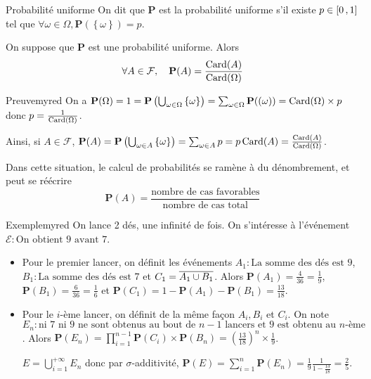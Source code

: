     \begin{defi}{Probabilité uniforme}{}
        On dit que $\mathbf{P}$ est la probabilité uniforme s’il existe $p \in \left[ 0 \, , 1 \right]$ tel que $\forall \omega \in \Omega, \mathbf{P}(\left\{\omega\right\}) = p$.
    \end{defi}

    \begin{theo}{}{}
        On suppose que $\mathbf{P}$ est une probabilité uniforme. Alors
        \[ \forall A \in \mathcal{F}, \quad \mathbf{P}(A) = \frac{\operatorname{Card}(A)}{\operatorname{Card}(\Omega)} \]   
    \end{theo}

    \begin{demo}{Preuve}{myred}
        On a $\mathbf{P}(\Omega) = 1 = \mathbf{P}\left(\bigcup_{\omega \in \Omega} \left\{\omega\right\}\right) = \sum_{\omega \in \Omega} \mathbf{P}(\left(\omega\right)) = \operatorname{Card}(\Omega) \times p$ donc $p = \frac{1}{\operatorname{Card}(\Omega)}$.

        Ainsi, si $A \in \mathcal{F}$, $\mathbf{P}(A) = \mathbf{P}\left(\bigcup_{\omega \in A} \left\{\omega\right\}\right) = \sum_{\omega \in A} p = p \operatorname{Card}(A) = \frac{\operatorname{Card}(A)}{\operatorname{Card}(\Omega)}$.
    \end{demo}

    Dans cette situation, le calcul de probabilités se ramène à du dénombrement, et peut se réécrire 
    \[ \mathbf{P}(A) = \frac{\text{nombre de cas favorables}}{\text{nombre de cas total}} \]   

    \begin{omed}{Exemple}{myred}
        On lance 2 dés, une infinité de fois. On s’intéresse à l’événement $\mathcal{E} : \text{On obtient 9 avant 7}$.
        \begin{itemize}
            \item Pour le premier lancer, on définit les événements $A_1 : \text{La somme des dés est 9}$, $B_1 : \text{La somme des dés est 7}$ et $C_1 = \overline{A_1 \cup B_1}$. Alors $\mathbf{P}(A_1) = \frac{4}{36} = \frac{1}{9}$, $\mathbf{P}(B_1) = \frac{6}{36} = \frac{1}{6}$ et $\mathbf{P}(C_1) = 1 - \mathbf{P}(A_1)- \mathbf{P}(B_1) = \frac{13}{18}$. 
            \item Pour le $i$-ème lancer, on définit de la même façon $A_i, B_i$ et $C_i$. On note $E_n : \text{ni 7 ni 9 ne sont obtenus au bout de } n-1 \text{ lancers et 9 est obtenu au } n\text{-ème}$. Alors $\mathbf{P}(E_n) = \prod_{i=1}^{n-1} \mathbf{P}(C_i) \times \mathbf{P}(B_n) = \left(\frac{13}{18}\right)^n \times \frac{1}{9}$. 
             
            $E = \bigcup_{i = 1}^{+\infty} E_n$ donc par $\sigma$-additivité, $\mathbf{P}(E) = \sum_{i=1}^n \mathbf{P}(E_n) = \frac{1}{9} \frac{1}{1 - \frac{13}{18}} = \frac{2}{5}$.
        \end{itemize}
    \end{omed}

